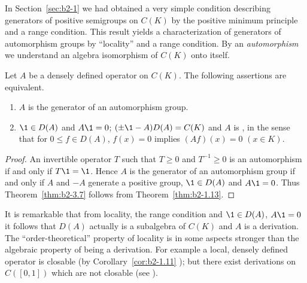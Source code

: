 In Section~\ref{sec:b2-1} we had obtained a very simple condition describing generators of positive semigroups on $C(K)$ by the positive minimum principle and a range condition.
This result yields a characterization of generators of automorphism groups by \enquote{locality} and a range condition.
By an \emph{automorphism} we understand an algebra isomorphism of\/ $C(K)$ onto itself.
\begin{theorem}\label{thm:b2-3.7}
Let $A$ be a densely defined operator on $C(K)$.
The following assertions are equivalent.
\begin{enumerate}[\upshape (a)]
\item \label{thm:b2-3.7-1}
$A$ is the generator of an automorphism group.
\item \label{thm:b2-3.7-2}
$\1 \in D(A)$ and $A\1 = 0$; $(\pm \1 - A)D(A) = C(K)$ and $A$ is , in the sense that for $0 \leq f \in D(A)$, $f(x) = 0$ implies $(Af)(x) = 0$ $(x \in K)$.
\end{enumerate}
\end{theorem}
\begin{proof}
An invertible operator $T$ such that $T \geq 0$ and $T^{-1} \geq 0$ is an automorphism if and only if\/ $T\1 = \1$.
Hence $A$ is the generator of an automorphism group if and only if\/ $A$ and $-A$ generate a positive group, $\1 \in D(A)$ and $A\1 = 0$.
Thus Theorem~\ref{thm:b2-3.7} follows from Theorem~\ref{thm:b2-1.13}.
\end{proof}
\begin{remark*}\label{rem:b2-3.7a}
It is remarkable that from locality, the range condition and $\1 \in D(A)$, $A\1 = 0$ it follows that $D(A)$ actually is a subalgebra of\/ $C(K)$ and $A$ is a derivation.
The \enquote{order-theoretical} property of locality is in some aspects stronger than the algebraic property of being a derivation.
For example a local, densely defined operator is closable (by Corollary~\ref{cor:b2-1.11} ); but there exist derivations on $C([0,1])$ which are not closable (see \textcite{brattelirobinson:1975}).
\end{remark*}
